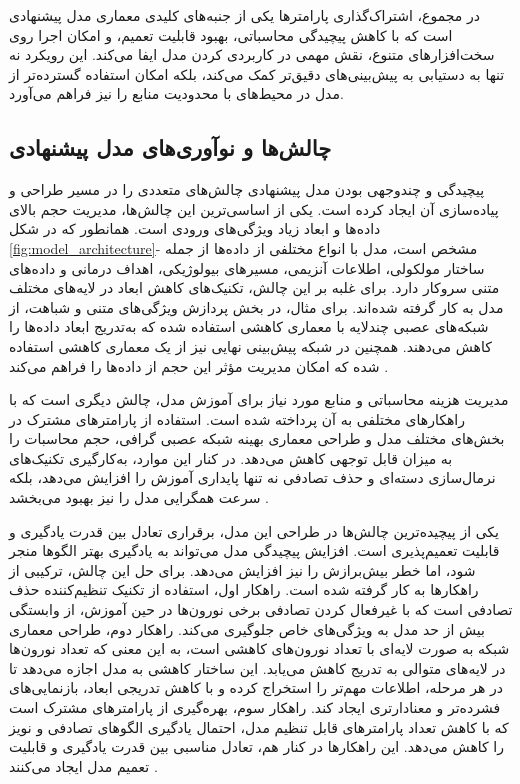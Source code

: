 در مجموع، اشتراک‌گذاری پارامترها یکی از جنبه‌های کلیدی معماری مدل پیشنهادی است که با کاهش پیچیدگی محاسباتی، بهبود قابلیت تعمیم، و امکان اجرا روی سخت‌افزارهای متنوع، نقش مهمی در کاربردی کردن مدل ایفا می‌کند. این رویکرد نه تنها به دستیابی به پیش‌بینی‌های دقیق‌تر کمک می‌کند، بلکه امکان استفاده گسترده‌تر از مدل در محیط‌های با محدودیت منابع را نیز فراهم می‌آورد.

\subsection{چالش‌ها و نوآوری‌های مدل پیشنهادی}

پیچیدگی و چندوجهی بودن مدل پیشنهادی چالش‌های متعددی را در مسیر طراحی و پیاده‌سازی آن ایجاد کرده است. یکی از اساسی‌ترین این چالش‌ها، مدیریت حجم بالای داده‌ها و ابعاد زیاد ویژگی‌های ورودی است. همانطور که در شکل \ref{fig:model_architecture}- مشخص است، مدل با انواع مختلفی از داده‌ها از جمله ساختار مولکولی، اطلاعات آنزیمی، مسیرهای بیولوژیکی، اهداف درمانی و داده‌های متنی سروکار دارد. برای غلبه بر این چالش، تکنیک‌های کاهش ابعاد در لایه‌های مختلف مدل به کار گرفته شده‌اند. برای مثال، در بخش پردازش ویژگی‌های متنی و شباهت، از شبکه‌های عصبی چندلایه با معماری کاهشی استفاده شده که به‌تدریج ابعاد داده‌ها را کاهش می‌دهند. همچنین در شبکه پیش‌بینی نهایی نیز از یک معماری کاهشی استفاده شده که امکان مدیریت مؤثر این حجم از داده‌ها را فراهم می‌کند \cite{ref_dai2020}.

مدیریت هزینه محاسباتی و منابع مورد نیاز برای آموزش مدل، چالش دیگری است که با راهکارهای مختلفی به آن پرداخته شده است. استفاده از پارامترهای مشترک در بخش‌های مختلف مدل و طراحی معماری بهینه شبکه عصبی گرافی، حجم محاسبات را به میزان قابل توجهی کاهش می‌دهد. در کنار این موارد، به‌کارگیری تکنیک‌های نرمال‌سازی دسته‌ای و حذف تصادفی نه تنها پایداری آموزش را افزایش می‌دهد، بلکه سرعت همگرایی مدل را نیز بهبود می‌بخشد \cite{ref_nyamabo2021}.

یکی از پیچیده‌ترین چالش‌ها در طراحی این مدل، برقراری تعادل بین قدرت یادگیری و قابلیت تعمیم‌پذیری است. افزایش پیچیدگی مدل می‌تواند به یادگیری بهتر الگوها منجر شود، اما خطر بیش‌برازش را نیز افزایش می‌دهد. برای حل این چالش، ترکیبی از راهکارها به کار گرفته شده است. راهکار اول، استفاده از تکنیک تنظیم‌کننده حذف تصادفی است که با غیرفعال کردن تصادفی برخی نورون‌ها در حین آموزش، از وابستگی بیش از حد مدل به ویژگی‌های خاص جلوگیری می‌کند. راهکار دوم، طراحی معماری شبکه به صورت لایه‌ای با تعداد نورون‌های کاهشی است، به این معنی که تعداد نورون‌ها در لایه‌های متوالی به تدریج کاهش می‌یابد. این ساختار کاهشی به مدل اجازه می‌دهد تا در هر مرحله، اطلاعات مهم‌تر را استخراج کرده و با کاهش تدریجی ابعاد، بازنمایی‌های فشرده‌تر و معنادارتری ایجاد کند. راهکار سوم، بهره‌گیری از پارامترهای مشترک است که با کاهش تعداد پارامترهای قابل تنظیم مدل، احتمال یادگیری الگوهای تصادفی و نویز را کاهش می‌دهد. این راهکارها در کنار هم، تعادل مناسبی بین قدرت یادگیری و قابلیت تعمیم مدل ایجاد می‌کنند \cite{ref_he2023}.

